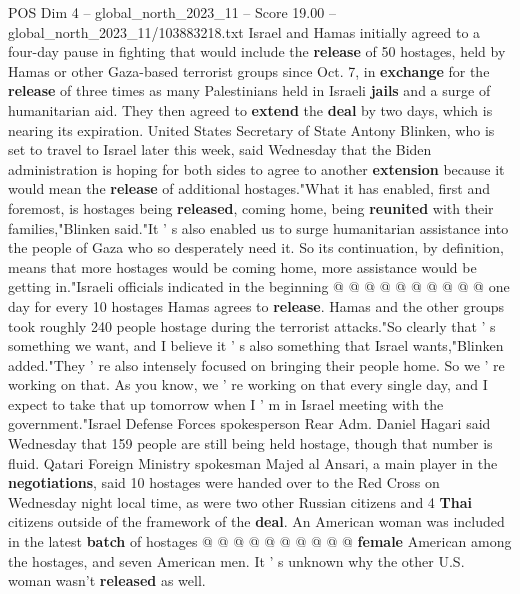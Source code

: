 \begin{textsample}{POS Dim 4 – global\_north\_2023\_11 – Score 19.00 – global\_north\_2023\_11/103883218.txt}  \label{ex:f4_pos_279}
Israel and Hamas initially agreed to a four-day pause in fighting that would include the \textbf{release} of 50 hostages, held by Hamas or other Gaza-based terrorist groups since Oct. 7, in \textbf{exchange} for the \textbf{release} of three times as many Palestinians held in Israeli \textbf{jails} and a surge of humanitarian aid.
They then agreed to \textbf{extend} the \textbf{deal} by two days, which is nearing its expiration.
United States Secretary of State Antony Blinken, who is set to travel to Israel later this week, said Wednesday that the Biden administration is hoping for both sides to agree to another \textbf{extension} because it would mean the \textbf{release} of additional hostages."What it has enabled, first and foremost, is hostages being \textbf{released}, coming home, being \textbf{reunited} with their families,"Blinken said."It ' s also enabled us to surge humanitarian assistance into the people of Gaza who so desperately need it.
So its continuation, by definition, means that more hostages would be coming home, more assistance would be getting in."Israeli officials indicated in the beginning @ @ @ @ @ @ @ @ @ @ one day for every 10 hostages Hamas agrees to \textbf{release}.
Hamas and the other groups took roughly 240 people hostage during the terrorist attacks."So clearly that ' s something we want, and I believe it ' s also something that Israel wants,"Blinken added."They ' re also intensely focused on bringing their people home.
So we ' re working on that.
As you know, we ' re working on that every single day, and I expect to take that up tomorrow when I ' m in Israel meeting with the government."Israel Defense Forces spokesperson Rear Adm.
Daniel Hagari said Wednesday that 159 people are still being held hostage, though that number is fluid.
Qatari Foreign Ministry spokesman Majed al Ansari, a main player in the \textbf{negotiations}, said 10 hostages were handed over to the Red Cross on Wednesday night local time, as were two other Russian citizens and 4 \textbf{Thai} citizens outside of the framework of the \textbf{deal}.
An American woman was included in the latest \textbf{batch} of hostages @ @ @ @ @ @ @ @ @ @ \textbf{female} American among the hostages, and seven American men.
It ' s unknown why the other U.S. woman wasn't \textbf{released} as well.

\end{textsample}
